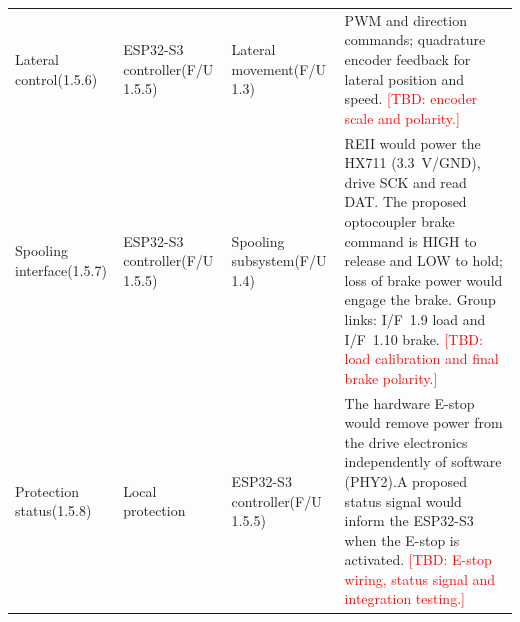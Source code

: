 \begin{table}[H]
\begin{tabularx}{\textwidth}{@{}
        >{\raggedright\arraybackslash}p{2.15cm}
        >{\raggedright\arraybackslash}p{2.7cm}
        >{\raggedright\arraybackslash}p{2.9cm}
        >{\raggedright\arraybackslash}X
    @{}}
        Lateral control\newline (1.5.6) &
        ESP32-S3 controller\newline (F/U 1.5.5) &
        Lateral movement\newline (F/U 1.3) &
        PWM and direction commands; quadrature encoder feedback
        for lateral position and speed.
        \textcolor{red}{[TBD: encoder scale and polarity.]}
        \\[3pt]

        Spooling interface\newline (1.5.7) &
        ESP32-S3 controller\newline (F/U 1.5.5) &
        Spooling subsystem\newline (F/U 1.4) &
        REII would power the HX711 (3.3~V/GND), drive SCK
        and read DAT. The proposed optocoupler brake command
        is HIGH to release and LOW to hold; loss of brake
        power would engage the brake. Group links:
        I/F~1.9 load and I/F~1.10 brake.
        \textcolor{red}{[TBD: load calibration and final brake polarity.]}
        \\[3pt]

        Protection status\newline (1.5.8) &
        Local protection &
        ESP32-S3 controller\newline (F/U 1.5.5) &
        The hardware E-stop would remove power from the drive
        electronics independently of software (PHY2).A proposed status signal
        would inform the ESP32-S3 when the E-stop is activated.
        \textcolor{red}{[TBD: E-stop wiring, status signal and
        integration testing.]}
        \\

        \bottomrule
    \end{tabularx}
\end{table}



